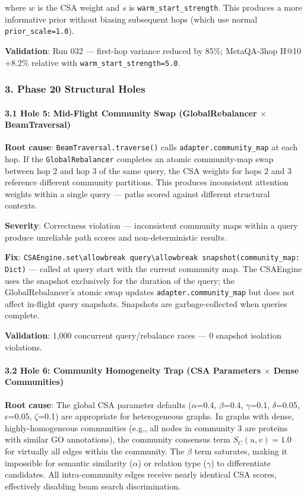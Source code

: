 where $w$ is the CSA weight and $s$ is \texttt{warm\_start\_strength}. This produces a more informative prior without biasing subsequent hops (which use normal \texttt{prior\_scale=1.0}).

\textbf{Validation}: Run 032 — first-hop variance reduced by 85\%; MetaQA-3hop H@10 +8.2\% relative with \texttt{warm\_start\_strength=5.0}.

\subsubsection{3. Phase 20 Structural Holes}

\paragraph{3.1 Hole 5: Mid-Flight Community Swap (GlobalRebalancer $\times$ BeamTraversal)}

\textbf{Root cause}: \texttt{BeamTraversal.traverse()} calls \texttt{adapter.community\_map} at each hop. If the \texttt{GlobalRebalancer} completes an atomic community-map swap between hop 2 and hop 3 of the same query, the CSA weights for hops 2 and 3 reference different community partitions. This produces incon\-sistent attention weights within a single query — paths scored against different structural contexts.

\textbf{Severity}: Correctness violation — incon\-sistent community maps within a query produce unreliable path scores and non-deter\-ministic results.

\textbf{Fix}: \texttt{CSAEngine.set\textbackslash allowbreak query\textbackslash allowbreak snapshot(community\_map: Dict)} — called at query start with the current community map. The CSAEngine uses the snapshot exclusively for the duration of the query; the GlobalRebalancer's atomic swap updates \texttt{adapter.community\_map} but does not affect in-flight query snapshots. Snapshots are garbage-collected when queries complete.

\textbf{Validation}: 1,000 concurrent query/rebalance races — 0 snapshot isolation violations.

\paragraph{3.2 Hole 6: Community Homogeneity Trap (CSA Parameters $\times$ Dense Communities)}

\textbf{Root cause}: The global CSA parameter defaults ($\alpha$=0.4, $\beta$=0.4, $\gamma$=0.1, $\delta$=0.05, $\epsilon$=0.05, $\zeta$=0.1) are appropriate for heter\-ogeneous graphs. In graphs with dense, highly-homogeneous communities (e.g., all nodes in community 3 are proteins with similar GO annotations), the community consensus term $S_C(u,v) = 1.0$ for virtually all edges within the community. The $\beta$ term saturates, making it impossible for semantic similarity ($\alpha$) or relation type ($\gamma$) to diffe\-rentiate candidates. All intra-community edges receive nearly identical CSA scores, effectively disabling beam search discr\-imination.

